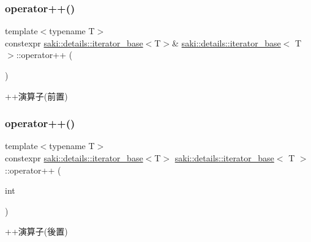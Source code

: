 \subsubsection{\texorpdfstring{operator++()}{operator++()}\hspace{0.1cm}{\footnotesize\ttfamily [1/2]}}
{\footnotesize\ttfamily template$<$typename T$>$ \\
constexpr \mbox{\hyperlink{classsaki_1_1details_1_1iterator__base}{saki\+::details\+::iterator\+\_\+base}}$<$T$>$\& \mbox{\hyperlink{classsaki_1_1details_1_1iterator__base}{saki\+::details\+::iterator\+\_\+base}}$<$ T $>$\+::operator++ (\begin{DoxyParamCaption}{ }\end{DoxyParamCaption})\hspace{0.3cm}{\ttfamily [inline]}}



++演算子(前置) 

\mbox{\label{classsaki_1_1details_1_1iterator__base_a47eb0dcb7d0467879a64eb252079d617}} 
\subsubsection{\texorpdfstring{operator++()}{operator++()}\hspace{0.1cm}{\footnotesize\ttfamily [2/2]}}
{\footnotesize\ttfamily template$<$typename T$>$ \\
constexpr \mbox{\hyperlink{classsaki_1_1details_1_1iterator__base}{saki\+::details\+::iterator\+\_\+base}}$<$T$>$ \mbox{\hyperlink{classsaki_1_1details_1_1iterator__base}{saki\+::details\+::iterator\+\_\+base}}$<$ T $>$\+::operator++ (\begin{DoxyParamCaption}\item[{int}]{ }\end{DoxyParamCaption})\hspace{0.3cm}{\ttfamily [inline]}}



++演算子(後置) 

\mbox{\label{classsaki_1_1details_1_1iterator__base_abd955d1a288f42f0231f22c8a1e73040}} 
